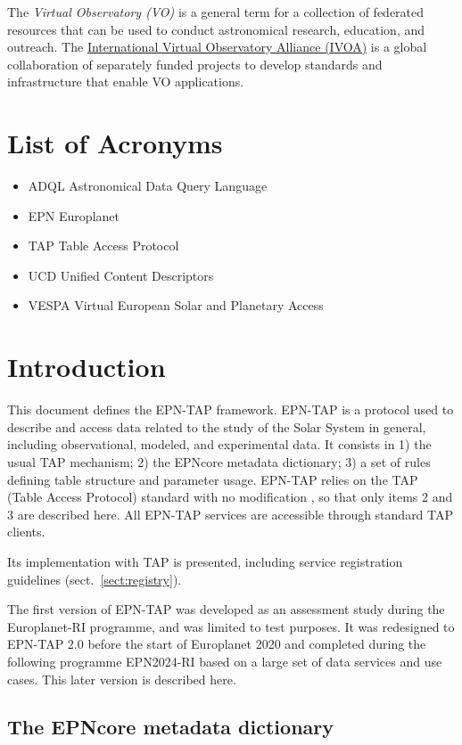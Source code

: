 \documentclass[11pt,a4paper]{ivoa}
\begin{document}
The \emph{Virtual Observatory (VO)} is a
general term for a collection of federated resources that can be used
to conduct astronomical research, education, and outreach.
The \href{http://www.ivoa.net}{International
Virtual Observatory Alliance (IVOA)} is a global
collaboration of separately funded projects to develop standards and
infrastructure that enable VO applications.

\section*{List of Acronyms}
\begin{itemize}
\item{ADQL} Astronomical Data Query Language
\item{EPN} Europlanet
\item{TAP} Table Access Protocol 
\item{UCD} Unified Content Descriptors
\item{VESPA} Virtual European Solar and Planetary Access
\end{itemize}

\section{Introduction}


This document defines the EPN-TAP framework. EPN-TAP is a protocol used to describe and access data related to the study of the Solar System in general, including observational, modeled, and experimental data. It consists in 1) the usual TAP mechanism; 2) the EPNcore metadata dictionary; 3) a set of rules defining table structure and parameter usage. EPN-TAP relies on the TAP (Table Access Protocol) standard with no modification \citep{2010ivoa.spec.0327D}, so that only items 2 and 3 are described here. All EPN-TAP services are accessible through standard TAP clients. 

Its implementation with TAP is presented, including service registration guidelines (sect.~\ref{sect:registry}). 

The first version of EPN-TAP was developed as an assessment study during the Europlanet-RI programme, and was limited to test purposes. It was redesigned to EPN-TAP 2.0 before the start of Europlanet 2020 and completed during the following programme EPN2024-RI based on a large set of data services and use cases. This later version is described here.


\subsection{The EPNcore metadata dictionary}
\end{document}
